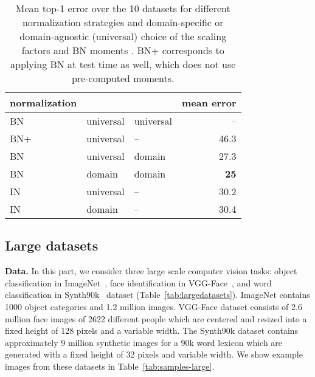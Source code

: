 \documentclass[10pt,twocolumn,letterpaper]{article}
\renewcommand{\paragraph}[1]{\par\medskip\noindent\textbf{#1}}
\begin{document}
\begin{table}
	\centering
	\begin{tabular}{lllr}
		\toprule
		normalization &  &  & mean error\\
		\midrule
		BN         & universal & universal & --   \\
		BN+        & universal & --        & 46.3 \\
	    BN         & universal & domain    & 27.3 \\ 
		BN         & domain    & domain    & \bf{25} \\
		IN         & universal & --        & 30.2 \\
	    IN         & domain    & --        & 30.4 \\
	    \bottomrule
	\end{tabular}
	\caption{Mean top-1 error over the 10 datasets for different normalization strategies and domain-specific or domain-agnostic (universal) choice of the scaling factors  and BN moments . BN+ corresponds to applying BN at test time as well, which does not use pre-computed moments.}
	\label{tab:norm}
\end{table} 
\subsection{Large datasets}\label{s:large-data}

\paragraph{Data.} In this part, we consider three large scale computer vision tasks: object classification in ImageNet~\cite{russakovsky14imagenet}, face identification in VGG-Face~\cite{parkhi15deep}, and word classification in Synth90k~\cite{jaderberg14synthetic} dataset (Table~\ref{tab:largedatasets}). ImageNet contains 1000 object categories and 1.2 million images. VGG-Face dataset consists of 2.6 million face images of 2622 different people which are centered and resized into a fixed height of 128 pixels and a variable width. The Synth90k dataset contains approximately 9 million synthetic images for a 90k word lexicon which are generated with a fixed height of 32 pixels and variable width. We show example images from these datasets in Table~\ref{tab:samples-large}.
\end{document}

